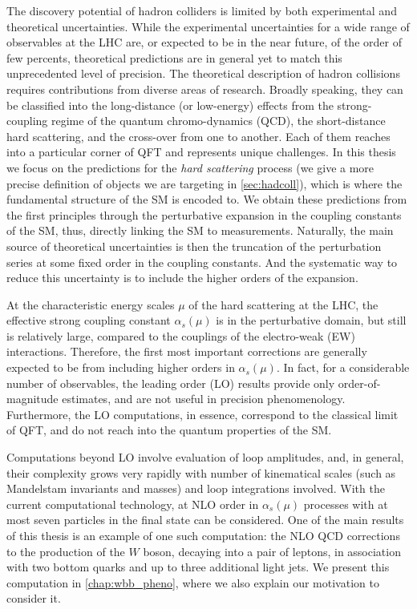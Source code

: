 The discovery potential of hadron colliders is limited by both experimental and theoretical uncertainties.
While the experimental uncertainties for a wide range of observables at the LHC are, or expected to be in the near future, of the order of few percents,
theoretical predictions are in general yet to match this unprecedented level of precision.
The theoretical description of hadron collisions requires contributions from diverse areas of research.
Broadly speaking, they can be classified into the long-distance (or low-energy) effects from 
the strong-coupling regime of the quantum chromo-dynamics (QCD), the short-distance hard scattering, and
the cross-over from one to another.
Each of them reaches into a particular corner of QFT and represents unique challenges.
In this thesis we focus on the predictions for the \emph{hard scattering} process (we give a more precise definition of objects we are targeting in \cref{sec:hadcoll}),
which is where the fundamental structure of the SM is encoded to.
We obtain these predictions from the first principles through the perturbative expansion in the coupling constants of the SM, thus, directly linking the SM to measurements.
Naturally, the main source of theoretical uncertainties is then the truncation
of the perturbation series at some fixed order in the coupling constants.
And the systematic way to reduce this uncertainty is to include the higher orders of the expansion.

At the characteristic energy scales $\mu$ of the hard scattering at the LHC, the effective strong coupling constant $\alpha_s(\mu)$
is in the perturbative domain, but still is relatively large, compared to the couplings of the electro-weak (EW) interactions.
Therefore, the first most important corrections are generally expected to be from including higher orders in $\alpha_s(\mu)$.
In fact, for a considerable number of observables,
the leading order (LO) results provide only order-of-magnitude estimates, and are not useful in precision phenomenology.
Furthermore, the LO computations, in essence, correspond to the classical limit of QFT, and do not reach into the quantum properties of the SM.

Computations beyond LO involve evaluation of loop amplitudes, and, in general,
their complexity grows very rapidly with number of kinematical scales (such as Mandelstam invariants and masses)  and loop integrations involved.
With the current computational technology, at NLO order in $\alpha_s(\mu)$ processes with at most seven particles in the final state
can be considered. One of the main results of this thesis is an example of one such computation:
the NLO QCD corrections to the production of the $W$ boson, decaying into a pair of leptons, in association with 
two bottom quarks and up to three additional light jets. We present this computation in \cref{chap:wbb_pheno},
where we also explain our motivation to consider it.


